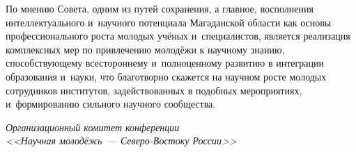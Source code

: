По мнению Совета, одним из путей сохранения, а главное, восполнения интеллектуального и~научного потенциала Магаданской области как основы профессионального роста молодых учёных и~специалистов, является реализация комплексных мер по привлечению молодёжи к научному знанию, способствующему всестороннему и~полноценному развитию в интеграции образования и~науки, что благотворно скажется на научном росте молодых сотрудников институтов, задействованных в подобных мероприятиях, и~формированию сильного научного сообщества.


\begin{flushright}
\textit{Организационный комитет конференции\\
<<Научная молодёжь~--- Северо-Востоку России>>}
\end{flushright}
